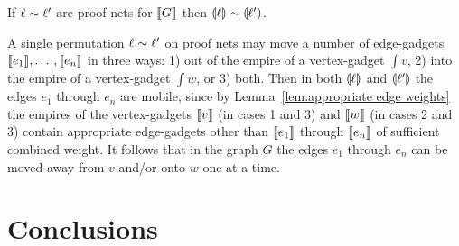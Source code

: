 \documentclass[conference,onecolumn]{IEEEtran}
\begin{document}
\begin{lemma}
If $\ell\sim\ell'$ are proof nets for $\llbracket G\rrbracket$ then $\llparenthesis\ell\rrparenthesis\sim\llparenthesis\ell'\rrparenthesis$.
\end{lemma}

\begin{IEEEproof}
A single permutation $\ell\sim\ell'$ on proof nets may move a number of edge-gadgets $\llbracket e_1\rrbracket,\dotso,\llbracket e_n\rrbracket$ in three ways: 1) out of the empire of a vertex-gadget $\int v$, 2) into the empire of a vertex-gadget $\int w$, or 3) both.
%
Then in both $\llparenthesis\ell\rrparenthesis$ and $\llparenthesis\ell'\rrparenthesis$ the edges $e_1$ through $e_n$ are mobile, since by Lemma~\ref{lem:appropriate edge weights} the empires of the vertex-gadgets $\llbracket v\rrbracket$ (in cases 1 and 3) and $\llbracket w\rrbracket$ (in cases 2 and 3) contain appropriate edge-gadgets other than $\llbracket e_1\rrbracket$ through $\llbracket e_n\rrbracket$ of sufficient combined weight.
%
It follows that in the graph $G$ the edges $e_1$ through $e_n$ can be moved away from $v$ and/or onto $w$ one at a time.

\end{IEEEproof}





\section{Conclusions}










\end{document}
